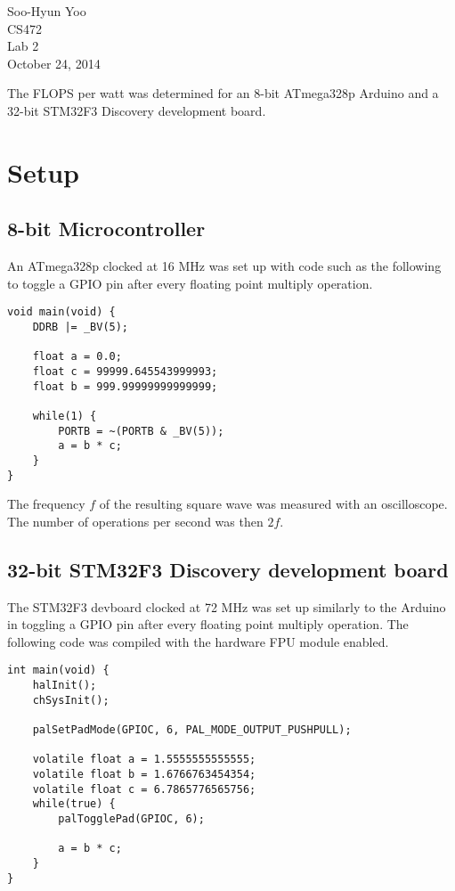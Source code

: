 \documentclass[12pt,letterpaper]{article}
\begin{document}
Soo-Hyun Yoo \\
CS472 \\
Lab 2 \\
October 24, 2014

The FLOPS per watt was determined for an 8-bit ATmega328p Arduino and a 32-bit
STM32F3 Discovery development board.

\section*{Setup}

\subsection*{8-bit Microcontroller}

An ATmega328p clocked at 16 MHz was set up with code such as the following to
toggle a GPIO pin after every floating point multiply operation.

\begin{verbatim}
void main(void) {
    DDRB |= _BV(5);

    float a = 0.0;
    float c = 99999.645543999993;
    float b = 999.99999999999999;

    while(1) {
        PORTB = ~(PORTB & _BV(5));
        a = b * c;
    }
}
\end{verbatim}

The frequency $f$ of the resulting square wave was measured with an
oscilloscope. The number of operations per second was then $2f$.

\subsection*{32-bit STM32F3 Discovery development board}

The STM32F3 devboard clocked at 72 MHz was set up similarly to the Arduino in
toggling a GPIO pin after every floating point multiply operation. The
following code was compiled with the hardware FPU module enabled.

\begin{verbatim}
int main(void) {
    halInit();
    chSysInit();

    palSetPadMode(GPIOC, 6, PAL_MODE_OUTPUT_PUSHPULL);

    volatile float a = 1.5555555555555;
    volatile float b = 1.6766763454354;
    volatile float c = 6.7865776565756;
    while(true) {
        palTogglePad(GPIOC, 6);

        a = b * c;
    }
}
\end{verbatim}
\end{document}
